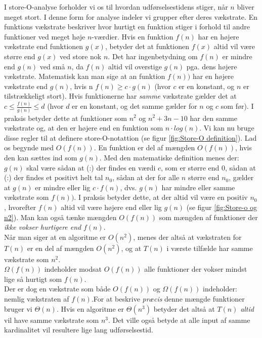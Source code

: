 I store-O-analyse forholder vi os til hvordan udførselsestidens stiger, når $n$ bliver meget stort. I denne form for analyse indeler vi grupper efter deres vækstrate. En funktions vækstrate beskriver hvor hurtigt en funktion stiger i forhold til andre funktioner ved meget høje $n$-værdier. Hvis en funktion $f(n)$ har en højere vækstrate end funktionen $g(x)$, betyder det at funktionen $f(x)$ altid vil være større end $g(x)$ ved store nok $n$. Det har ingenbetydning om $f(n)$ er mindre end $g(n)$ ved små $n$, da $f(n)$ altid vil overstige $g(n)$ pga. dens højere vækstrate. Matematisk kan man sige at an funktion $f(n))$ har en højere vækstrate end $g(n)$, hvis n $f(n) \geq c \cdot g(n)$  (hvor $c$ er en konstant, og $n$ er tilstrækkeligt stort). Hvis funktionerne har \emph{samme} vækstrate gælder det at $c \leq \frac{f(n)}{g(n)} \leq d$ (hvor $d$ er en konstant, og det samme gælder for $n$ og $c$ som før). I praksis betyder dette at funktioner som $n^2$ og $n^2+3n-10$ har den samme vækstrate og, at den er højere end en funktion som $n \cdot log(n)$. Vi kan nu bruge disse regler til at definere store-O-notattion (se figur \ref{fig:Store-O definition}). Lad os begynde med $O(f(n))$. En funktion er del af mængden $O(f(n))$, hvis den kan sættes ind som $g(n)$. Med den matematiske definition menes der: $g(n)$ skal være sådan at (:) der findes en værdi $c$, som er større end $0$, sådan at (:) der findes et positivt helt tal $n_0$, sådan at der for alle $n$ større end $n_0$, gælder at $g(n)$ er mindre eller lig $c \cdot f(n)$, dvs. $g(n)$ har mindre eller samme vækstrate som $f(n))$. I praksis betyder dette, at der altid vil være en positiv $n_0$, hvorefter $f(n)$ altid vil være højere end eller lig $g(n)$ (se figur \ref{fig:Store-o og n2}). Man kan også tænke mængden $O(f(n))$ som mængden af funktioner der \emph{ikke vokser hurtigere end} $f(n)$.\\

Når man siger at en algoritme er $O(n^2)$, menes der altså at vækstraten for $T(n)$ er en del af mængden $O(n^2)$, og at $T(n)$ i værste tilfælde har samme vækstrate som $n^2$.\\

$\Omega (f(n))$ indeholder modsat $O(f(n))$ alle funktioner der vokser mindst lige så hurtigt som $f(n)$.\\

Der er dog en vækstrate som både $O(f(n))$ og $\Omega (f(n))$ indeholder: nemlig vækstraten af $f(n)$.For at beskrive \emph{præcis} denne mængde funktioner bruger vi $\Theta (n)$. Hvis en algoritme er $\Theta (n^3)$ betyder det altså at $T(n)$ \emph{altid} vil have samme vækstrate som $n^3$. Det ville også betyde at alle input af samme kardinalitet vil resultere lige lang udførselsestid.


